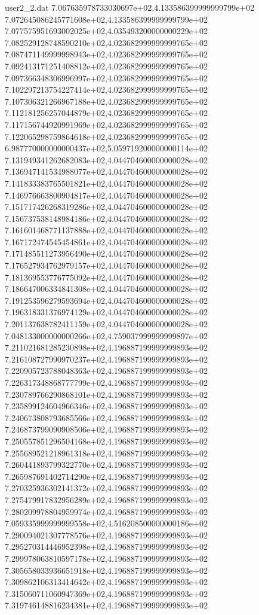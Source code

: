 \begin{filecontents}{user2_2.dat}
7.067635978733030697e+02,4.133586399999999799e+02
7.072645086245771608e+02,4.133586399999999799e+02
7.077575951693002025e+02,4.035493200000000229e+02
7.082529128748590210e+02,4.023682999999999765e+02
7.087471149999998943e+02,4.023682999999999765e+02
7.092413171251408812e+02,4.023682999999999765e+02
7.097366348306996997e+02,4.023682999999999765e+02
7.102297213754227414e+02,4.023682999999999765e+02
7.107306321266967188e+02,4.023682999999999765e+02
7.112181256257044879e+02,4.023682999999999765e+02
7.117156744920991969e+02,4.023682999999999765e+02
7.122065298759864618e+02,4.023682999999999765e+02
6.987770000000000437e+02,5.059719200000000114e+02
7.131949341262682083e+02,4.044704600000000028e+02
7.136947141534988077e+02,4.044704600000000028e+02
7.141833383765501821e+02,4.044704600000000028e+02
7.146976663800904817e+02,4.044704600000000028e+02
7.151717426268319286e+02,4.044704600000000028e+02
7.156737538148984186e+02,4.044704600000000028e+02
7.161601468771137888e+02,4.044704600000000028e+02
7.167172474545454861e+02,4.044704600000000028e+02
7.171485511273956490e+02,4.044704600000000028e+02
7.176527934762979157e+02,4.044704600000000028e+02
7.181369553776775092e+02,4.044704600000000028e+02
7.186647006334841308e+02,4.044704600000000028e+02
7.191253596279593694e+02,4.044704600000000028e+02
7.196318331376974129e+02,4.044704600000000028e+02
7.201137638782411159e+02,4.044704600000000028e+02
7.048133000000000266e+02,4.759037999999999897e+02
7.211021681285230898e+02,4.196887199999999893e+02
7.216108727990970237e+02,4.196887199999999893e+02
7.220905723788048363e+02,4.196887199999999893e+02
7.226317348868777799e+02,4.196887199999999893e+02
7.230789766290868101e+02,4.196887199999999893e+02
7.235899124604966346e+02,4.196887199999999893e+02
7.240673808793685566e+02,4.196887199999999893e+02
7.246873799090908506e+02,4.196887199999999893e+02
7.250557851296504168e+02,4.196887199999999893e+02
7.255689521218961318e+02,4.196887199999999893e+02
7.260441893799322770e+02,4.196887199999999893e+02
7.265987691402714290e+02,4.196887199999999893e+02
7.270325936302141372e+02,4.196887199999999893e+02
7.275479917832956289e+02,4.196887199999999893e+02
7.280209978804959974e+02,4.196887199999999893e+02
7.059335999999999558e+02,4.516208500000000186e+02
7.290094021307778576e+02,4.196887199999999893e+02
7.295270314446952398e+02,4.196887199999999893e+02
7.299978063810597178e+02,4.196887199999999893e+02
7.305658033936651918e+02,4.196887199999999893e+02
7.309862106313414642e+02,4.196887199999999893e+02
7.315060711060947369e+02,4.196887199999999893e+02
7.319746148816234381e+02,4.196887199999999893e+02

\end{filecontents}
